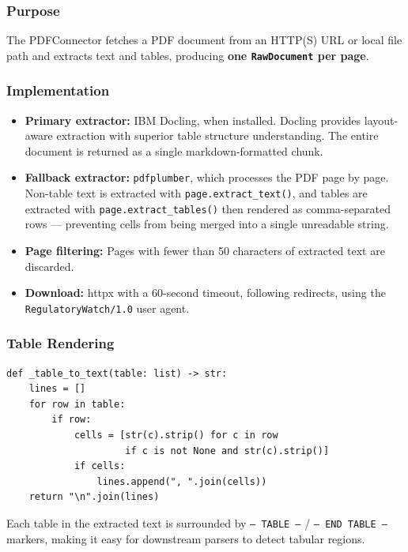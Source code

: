 \documentclass[12pt,a4paper]{article}
\begin{document}
\subsubsection{Purpose}

The PDFConnector fetches a PDF document from an HTTP(S) URL or local file path and extracts text and tables, producing \textbf{one \texttt{RawDocument} per page}.

\subsubsection{Implementation}

\begin{itemize}[noitemsep]
  \item \textbf{Primary extractor:} IBM Docling, when installed. Docling provides layout-aware extraction with superior table structure understanding. The entire document is returned as a single markdown-formatted chunk.
  \item \textbf{Fallback extractor:} \texttt{pdfplumber}, which processes the PDF page by page. Non-table text is extracted with \texttt{page.extract\_text()}, and tables are extracted with \texttt{page.extract\_tables()} then rendered as comma-separated rows — preventing cells from being merged into a single unreadable string.
  \item \textbf{Page filtering:} Pages with fewer than 50 characters of extracted text are discarded.
  \item \textbf{Download:} httpx with a 60-second timeout, following redirects, using the \texttt{RegulatoryWatch/1.0} user agent.
\end{itemize}

\subsubsection{Table Rendering}

\begin{lstlisting}[caption={Table-to-text rendering (pdfplumber)}]
def _table_to_text(table: list) -> str:
    lines = []
    for row in table:
        if row:
            cells = [str(c).strip() for c in row
                     if c is not None and str(c).strip()]
            if cells:
                lines.append(", ".join(cells))
    return "\n".join(lines)
\end{lstlisting}

Each table in the extracted text is surrounded by \texttt{--- TABLE ---} / \texttt{--- END TABLE ---} markers, making it easy for downstream parsers to detect tabular regions.
\end{document}
